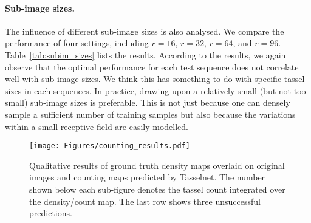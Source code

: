 \documentclass[twocolumn]{bmcart}%
\begin{document}
\paragraph{Sub-image sizes.} The influence of different sub-image sizes is also analysed. We compare the performance of four settings, including $r=16$, $r=32$, $r=64$, and $r=96$. Table~\ref{tab:subim_sizes} lists the results. According to the results, we again observe that the optimal performance for each test sequence does not correlate well with sub-image sizes. We think this has something to do with specific tassel sizes in each sequences. In practice, drawing upon a relatively small (but not too small) sub-image sizes is preferable. This is not just because one can densely sample a sufficient number of training samples but also because the variations within a small receptive field are easily modelled.

\begin{figure*}[h!]
	\centering
	\texttt{[image: Figures/counting\_results.pdf]}
	\caption{Qualitative results of ground truth density maps overlaid on original images and counting maps predicted by Tasselnet. The number shown below each sub-figure denotes the tassel count integrated over the density/count map. The last row shows three unsuccessful predictions.}
	\label{fig:count_maps}
\end{figure*}
\end{document}
